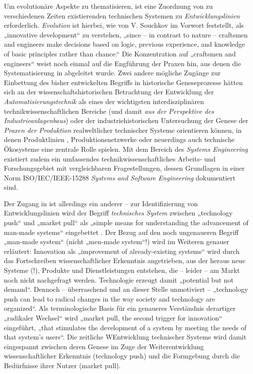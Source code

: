 \documentclass[11pt,a4paper]{article}
\begin{document}
Um evolutionäre Aspekte zu thematisieren, ist eine Zuordnung von zu
verschiedenen Zeiten existierenden technischen Systemen zu
\emph{Entwicklungslinien} erforderlich. \emph{Evolution} ist hierbei, wie von
V. Souchkov im Vorwort \cite[S. IX]{TESE2018} feststellt, als „innovative
development“ zu verstehen, „since -- in contrast to nature -- craftsmen and
engineers make decisions based on logic, previous experience, and knowledge of
basic principles rather than chance.“ Die Konzentration auf „craftsmen and
engineers“ weist noch einmal auf die Engführung der Praxen hin, aus denen die
Systematisierung in \cite{TESE2018} abgeleitet wurde. Zwei andere mögliche
Zugänge zur Einbettung des bisher entwickelten Begriffs in historische
Geneseprozesse hätten sich an der wissenschaftshistorischen Betrachtung
\cite{Weller2008} der Entwicklung der \emph{Automatisierungstechnik} als eines
der wichtigsten interdisziplinären technikwissenschaftlichen Bereiche (und
damit \emph{aus der Perspektive des Industrieanlagenbaus}) oder der
industriehistorischen Untersuchung der Genese der \emph{Praxen der Produktion}
realweltlicher technischer Systeme orientieren können, in denen Produktlinien
\cite{Pohl2005}, Produktionsnetzwerke \cite{Friedli2013} oder neuerdings auch
technische Ökosysteme \cite{Graebe2018} eine zentrale Rolle spielen. Mit dem
Bereich des \emph{Systems Engineering} existiert zudem ein umfassendes
technikwissenschaftliches Arbeits- und Forschungsgebiet mit vergleichbaren
Fragestellungen, dessen Grundlagen in einer Norm ISO/IEC/IEEE-15288
\emph{Systems and Software Engineering} dokumentiert sind.

Der Zugang in \cite{TESE2018} ist allerdings ein anderer -- zur
Identifizierung von Entwicklungslinien wird der Begriff \emph{technisches
  System} zwischen „technology push“ und „market pull“ als „simple means for
understanding the advancement of man-made systems“ eingebettet
\cite[S. 1]{TESE2018}. Der Bezug auf den noch ungenaueren Begriff „man-made
system“ (nicht „men-made system“!) wird im Weiteren genauer erläutert:
Innovation als „improvement of already-existing systems“ wird durch das
Fortschreiben wissenschaftlicher Erkenntnis angetrieben, aus der heraus neue
Systeme (!), Produkte und Dienstleistungen entstehen, die -- leider -- am
Markt noch nicht nachgefragt werden. Technologie erzeugt damit „potential but
not demand“. Dennoch -- überraschend und an dieser Stelle unmotiviert --
„technology push can lead to radical changes in the way society and technology
are organized“. Als terminologische Basis für ein genaueres Verständnis
derartiger „radikaler Wechsel“ wird „market pull, the second trigger for
innovation“ eingeführt, „that stimulates the development of a system by
meeting the needs of that system's users“. Die zeitliche WEntwicklung
technischer Systeme wird damit eingespannt zwischen deren Genese im Zuge der
Weiterentwicklung wissenschaftlicher Erkenntnis (technology push) und die
Formgebung durch die Bedürfnisse ihrer Nutzer (market pull).
\end{document}
